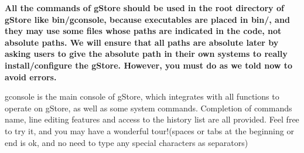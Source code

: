 \documentclass[titlepage, a4paper, 12pt]{article}
\begin{document}
\textbf{All the commands of gStore should be used in the root directory of gStore like bin/gconsole, because executables are placed in bin/, and they may use some files whose paths are indicated in the code, not absolute paths. We will ensure that all paths are absolute later by asking users to give the absolute path in their own systems to really install/configure the gStore. However, you must do as we told now to avoid errors.}


gconsole is the main console of gStore, which integrates with all functions to operate on gStore, as well as some system commands.  Completion of commands name, line editing features and access to the history list are all provided. Feel free to try it, and you may have a wonderful tour!(spaces or tabs at the beginning or end is ok, and no need to type any special characters as separators)
\end{document}
